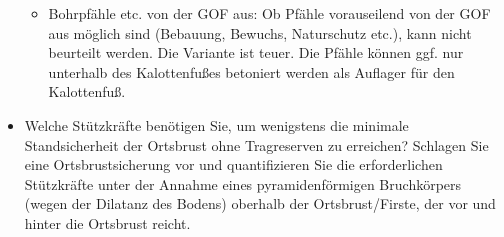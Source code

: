 \documentclass[fleqn,twoside]{article}
\begin{document}
\begin{small}
\begin{itemize}
\begin{itemize}[label={$\blacktriangleright$}]
        \item Bohrpfähle etc. von der GOF aus: Ob Pfähle vorauseilend von der GOF aus möglich sind (Bebauung, Bewuchs, Naturschutz etc.), kann nicht beurteilt werden. Die Variante ist teuer. Die Pfähle können ggf. nur unterhalb des Kalottenfußes betoniert werden als Auflager für den Kalottenfuß.
        \end{itemize}
    \item Welche Stützkräfte benötigen Sie, um wenigstens die minimale Standsicherheit der Ortsbrust ohne Tragreserven zu erreichen? Schlagen Sie eine Ortsbrustsicherung vor und quantifizieren Sie die erforderlichen Stützkräfte unter der Annahme eines pyramidenförmigen Bruchkörpers (wegen der Dilatanz des Bodens) oberhalb der Ortsbrust/Firste, der vor und hinter die Ortsbrust reicht.\\
    

\end{itemize}
\end{small}
\end{document}
